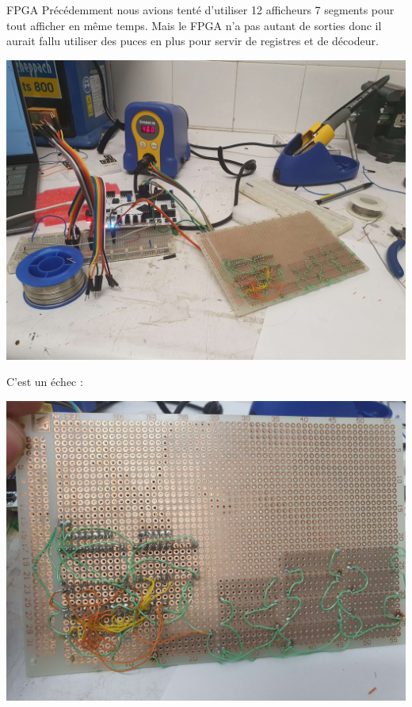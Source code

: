 \documentclass{beamer}
\begin{document}
\begin{frame}{FPGA}
    Précédemment nous avions tenté d'utiliser 12 afficheurs 7 segments pour tout afficher en même temps.
    Mais le FPGA n'a pas autant de sorties donc il aurait fallu utiliser des puces en plus pour servir
    de registres et de décodeur.
    \begin{center}
        \includegraphics[scale=0.05]{pictures/Soudure global.jpg}
    \end{center}
\end{frame}

\begin{frame}
    C'est un échec :
    \begin{center}
        \includegraphics[scale=0.07]{pictures/Soudure proche.jpg}
    \end{center}
\end{frame}
\end{document}
